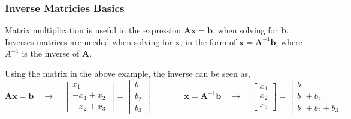         \subsubsection{Inverse Matricies Basics}
            Matrix multiplication is useful in the expression \(\boldsymbol{Ax}=\boldsymbol{b}\), when solving for 
            \(\boldsymbol{b}\). 
            Inverses matrices are needed when solving for \(\boldsymbol{x}\), in the form of 
            \(\boldsymbol{x}=\boldsymbol{A}^{-1} \boldsymbol{b}\), where \(A^{-1}\) is the inverse of \(\boldsymbol{A}\).
            
            \par \hfill \break
            Using the matrix in the above example, the inverse can be seen as,
            \begin{equation}
                \boldsymbol{Ax}=\boldsymbol{b} 
                \quad \rightarrow \quad
                \begin{bmatrix}
                    x_1 \\
                    -x_1 + x_2\\
                    -x_2 + x_3
                \end{bmatrix}
                =
                \begin{bmatrix}
                    b_1 \\
                    b_2 \\
                    b_3
                \end{bmatrix}
                \qquad \qquad
                \boldsymbol{x}=\boldsymbol{A}^{-1} \boldsymbol{b}
                \quad \rightarrow \quad
                \begin{bmatrix}
                    x_1 \\
                    x_2 \\
                    x_3
                \end{bmatrix}
                =
                \begin{bmatrix}
                    b_1 \\
                    b_1 + b_2 \\
                    b_1 + b_2 + b_3
                \end{bmatrix}
            \end{equation}
        
